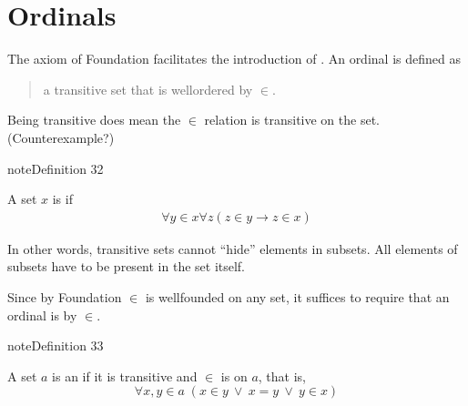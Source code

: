 \documentclass[letterpaper,10pt,english]{jupyterBook}
\begin{document}
\section{Ordinals}
\label{\detokenize{ZFC:ordinals}}
\sphinxAtStartPar
The axiom of Foundation facilitates the introduction of .
An ordinal is defined as
\begin{quote}

\sphinxAtStartPar
a transitive set that is well\sphinxhyphen{}ordered by \(\in\).
\end{quote}

\begin{sphinxShadowBox}
\sphinxstylesidebartitle{}

\sphinxAtStartPar
{}
Being transitive does  mean the \(\in\) relation is transitive on the set. (Counterexample?)
\end{sphinxShadowBox}
\label{ZFC:def-transitive}
\begin{sphinxadmonition}{note}{Definition 32}



\sphinxAtStartPar
A set \(x\) is  if
\begin{equation*}
\begin{split}
    \forall y \in x \forall z ( z \in y \to z \in x)
\end{split}
\end{equation*}\end{sphinxadmonition}

\sphinxAtStartPar
In other words, transitive sets cannot “hide” elements in subsets. All elements of subsets have to be present in the set itself.

\sphinxAtStartPar
Since by Foundation \(\in\) is well\sphinxhyphen{}founded on any set, it suffices to require that an ordinal is  by \(\in\).
\label{ZFC:def-ordinal}
\begin{sphinxadmonition}{note}{Definition 33}



\sphinxAtStartPar
A set \(a\) is an  if it is transitive and \(\in\) is  on \(a\), that is,
\begin{equation*} \tag{con}
\forall x,y \in a \; (x \in y \: \vee \: x=y \: \vee \: y \in x)
\end{equation*}\end{sphinxadmonition}
\end{document}
